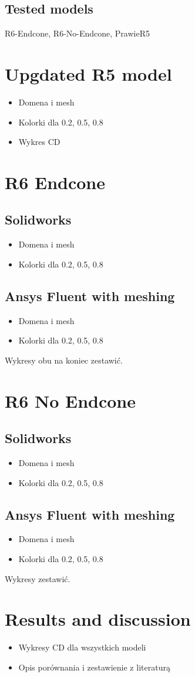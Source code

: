 \documentclass{article}
\begin{document}
\subsection{Tested models}
R6-Endcone, R6-No-Endcone, PrawieR5

\section{Upgdated R5 model}
\begin{itemize}
    \item Domena i mesh
    \item Kolorki dla 0.2, 0.5, 0.8
    \item Wykres CD
\end{itemize}

\section{R6 Endcone}
\subsection{Solidworks}
\begin{itemize}
    \item Domena i mesh
    \item Kolorki dla 0.2, 0.5, 0.8
\end{itemize}
\subsection{Ansys Fluent with meshing}
\begin{itemize}
    \item Domena i mesh
    \item Kolorki dla 0.2, 0.5, 0.8
\end{itemize}
Wykresy obu na koniec zestawić.

\section{R6 No Endcone}
\subsection{Solidworks}
\begin{itemize}
    \item Domena i mesh
    \item Kolorki dla 0.2, 0.5, 0.8
\end{itemize}
\subsection{Ansys Fluent with meshing}
\begin{itemize}
    \item Domena i mesh
    \item Kolorki dla 0.2, 0.5, 0.8
\end{itemize}
Wykresy zestawić.

\section{Results and discussion}
\begin{itemize}
    \item Wykresy CD dla wszystkich modeli
    \item Opis porównania i zestawienie z literaturą
\end{itemize}
\end{document}
